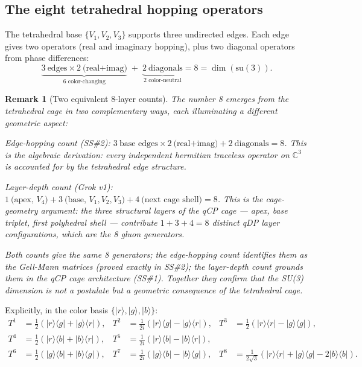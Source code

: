 \documentclass[11pt,a4paper]{article}
\newtheorem{remark}[theorem]{Remark}
\newcommand{\ket}[1]{|#1\rangle}
\newcommand{\bra}[1]{\langle#1|}
\begin{document}
\subsection{The eight tetrahedral hopping operators}

The tetrahedral base $\{V_1, V_2, V_3\}$ supports three undirected
edges.  Each edge gives two operators (real and imaginary hopping),
plus two diagonal operators from phase differences:
\begin{equation}
\underbrace{3\ \text{edges}\times2\ \text{(real+imag)}}_{\text{6 color-changing}}
\;+\;\underbrace{2\ \text{diagonals}}_{\text{2 color-neutral}}
= 8 = \dim(\mathrm{su}(3)).
\label{eq:count}
\end{equation}

\begin{remark}[Two equivalent 8-layer counts]
\label{rem:two_counts}
The number 8 emerges from the tetrahedral cage in two complementary
ways, each illuminating a different geometric aspect:

\textit{Edge-hopping count (SS\#2):}
$3\ \text{base edges}\times2\ \text{(real+imag)} + 2\ \text{diagonals} = 8$.
This is the algebraic derivation: every independent hermitian traceless
operator on $\mathbb{C}^3$ is accounted for by the tetrahedral edge structure.

\textit{Layer-depth count (Grok v1):}
$1\ \text{(apex, }V_4\text{)} + 3\ \text{(base, }V_1,V_2,V_3\text{)} +
4\ \text{(next cage shell)} = 8$.
This is the cage-geometry argument: the three structural layers of the
qCP cage — apex, base triplet, first polyhedral shell — contribute
$1+3+4 = 8$ distinct qDP layer configurations, which are the 8 gluon
generators.

Both counts give the same 8 generators; the edge-hopping count
identifies them as the Gell-Mann matrices (proved exactly in SS\#2);
the layer-depth count grounds them in the qCP cage architecture
(SS\#1).  Together they confirm that the SU(3) dimension is not a
postulate but a geometric consequence of the tetrahedral cage.
\end{remark}

Explicitly, in the color basis
$\{\ket{r},\ket{g},\ket{b}\}$:
\begin{align*}
T^1 &= \tfrac{1}{2}(\ket{r}\bra{g}+\ket{g}\bra{r}),&
T^2 &= \tfrac{1}{2i}(\ket{r}\bra{g}-\ket{g}\bra{r}),&
T^3 &= \tfrac{1}{2}(\ket{r}\bra{r}-\ket{g}\bra{g}),\\
T^4 &= \tfrac{1}{2}(\ket{r}\bra{b}+\ket{b}\bra{r}),&
T^5 &= \tfrac{1}{2i}(\ket{r}\bra{b}-\ket{b}\bra{r}),\\
T^6 &= \tfrac{1}{2}(\ket{g}\bra{b}+\ket{b}\bra{g}),&
T^7 &= \tfrac{1}{2i}(\ket{g}\bra{b}-\ket{b}\bra{g}),&
T^8 &= \tfrac{1}{2\sqrt3}(\ket{r}\bra{r}+\ket{g}\bra{g}-2\ket{b}\bra{b}).
\end{align*}
\end{document}
